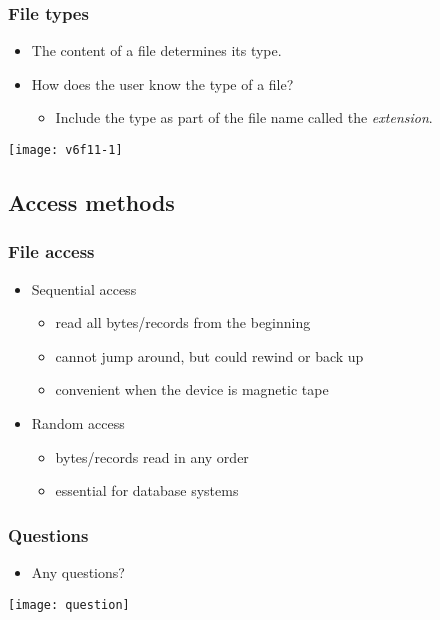 \documentclass[CJKutf8,dvipsnames,table]{beamer}
\begin{document}
\begin{CJK*}{UTF8}{song}
  \begin{frame}
    \frametitle{File types} \pause
    \begin{itemize}
    \item The content of a file determines its type. \pause
    \item How does the user know the type of a file? \pause
      \begin{itemize}
      \item Include the type as part of the file name called the \emph{extension}.\pause
      \end{itemize}
    \end{itemize}
    \begin{center}
      \texttt{[image: v6f11-1]}
    \end{center}
  \end{frame}

  \subsection{Access methods}

  \begin{frame}
    \frametitle{File access} \pause
    \begin{itemize}
    \item Sequential access \pause
      \begin{itemize}
      \item read all bytes/records from the beginning \pause
      \item cannot jump around, but could rewind or back up \pause
      \item convenient when the device is magnetic tape\pause
      \end{itemize}
    \item Random access \pause
      \begin{itemize}
      \item bytes/records read in any order \pause
      \item essential for database systems
      \end{itemize}
    \end{itemize}
  \end{frame}

  \begin{frame}
    \frametitle{Questions}
    \begin{itemize}
    \item Any questions?
    \end{itemize}
    \begin{center}
      \texttt{[image: question]}
    \end{center}
  \end{frame}


\end{CJK*}
\end{document}
